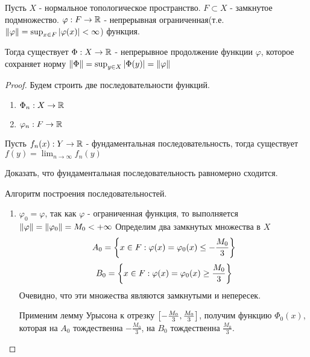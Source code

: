 \begin{theorem}
    Пусть $X$ - нормальное топологическое пространство. $F \subset X$ - замкнутое подмножество. $\varphi: F \rightarrow \mathbb{R}$ - непрерывная ограниченная(т.е. $\left\|\varphi\right\| = \sup_{x \in F}|\varphi(x)| < \infty$) функция.

    Тогда существует $\Phi: X \rightarrow \mathbb{R}$ - непрерывное продолжение функции $\varphi$, которое сохраняет норму $\left\|\Phi\right\| = \sup_{y \in X} \left|\Phi(y)\right| = \left\|\varphi\right\|$

\end{theorem}
\begin{proof}
    Будем строить две последовательности функций.

    \begin{enumerate}
        \item $\Phi_n: X \rightarrow \mathbb{R}$
        \item $\varphi_n: F \rightarrow \mathbb{R}$
    \end{enumerate}

    \begin{nota_bene}
        Пусть $f_n(x) : Y \rightarrow \mathbb{R}$ - фундаментальная последовательность, тогда существует $f(y) = \lim_{n \to \infty} f_n(y)$
        \begin{exercise}
            Доказать, что фундаментальная последовательность равномерно сходится.
        \end{exercise}
    \end{nota_bene}

    Алгоритм построения последовательностей.

    \begin{enumerate}
        \item $\varphi_0 = \varphi$, так как $\varphi$ - ограниченная функция, то выполняется $\left\|\varphi\right\| = \left\|\varphi_0\right\| = M_0 < +\infty$
        Определим два замкнутых множества в $X$
        \[
            A_0 = \left\{x \in F : \varphi(x) = \varphi_0(x) \leq -\frac{M_0}{3}\right\}
        \]
        \[
            B_0 = \left\{x \in F : \varphi(x) = \varphi_0(x) \geq \frac{M_0}{3}\right\}
        \]
        Очевидно, что эти множества являются замкнутыми и непересек.

        Применим лемму Урысона к отрезку $\left[-\frac{M_0}{3}, \frac{M_0}{3}\right]$, получим функцию $\Phi_0(x)$, которая на $A_0$ тождественна $-\frac{M_0}{3}$, на $B_0$ тождественна $\frac{M_0}{3}$.


\end{enumerate}
\end{proof}
